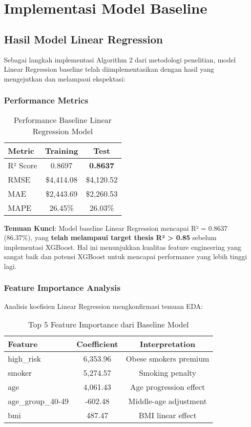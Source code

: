 \section{Implementasi Model Baseline}
\label{sec:baseline-model}

\subsection{Hasil Model Linear Regression}
\label{subsec:baseline-results}

Sebagai langkah implementasi Algorithm 2 dari metodologi penelitian, model Linear Regression baseline telah diimplementasikan dengan hasil yang mengejutkan dan melampaui ekspektasi:

\subsubsection{Performance Metrics}
\begin{table}[H]
\centering
\caption{Performance Baseline Linear Regression Model}
\label{tab:baseline-performance}
\begin{tabular}{|l|c|c|}
\hline
\textbf{Metric} & \textbf{Training} & \textbf{Test} \\
\hline
R² Score & 0.8697 & \textbf{0.8637} \\
RMSE & \$4,414.08 & \$4,120.52 \\
MAE & \$2,443.69 & \$2,260.53 \\
MAPE & 26.45\% & 26.03\% \\
\hline
\end{tabular}
\end{table}

\textbf{Temuan Kunci}: Model baseline Linear Regression mencapai R² = 0.8637 (86.37\%), yang \textbf{telah melampaui target thesis R² > 0.85} sebelum implementasi XGBoost. Hal ini menunjukkan kualitas feature engineering yang sangat baik dan potensi XGBoost untuk mencapai performance yang lebih tinggi lagi.

\subsubsection{Feature Importance Analysis}
Analisis koefisien Linear Regression mengkonfirmasi temuan EDA:

\begin{table}[H]
\centering
\caption{Top 5 Feature Importance dari Baseline Model}
\label{tab:baseline-features}
\begin{tabular}{|l|c|c|}
\hline
\textbf{Feature} & \textbf{Coefficient} & \textbf{Interpretation} \\
\hline
high\_risk & 6,353.96 & Obese smokers premium \\
smoker & 5,274.57 & Smoking penalty \\
age & 4,061.43 & Age progression effect \\
age\_group\_40-49 & -602.48 & Middle-age adjustment \\
bmi & 487.47 & BMI linear effect \\
\hline
\end{tabular}
\end{table}

